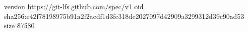 version https://git-lfs.github.com/spec/v1
oid sha256:e42f78198975b91a2f2acdf1d3fc318dc2027097d42909a3299312d39c90ad53
size 87580
